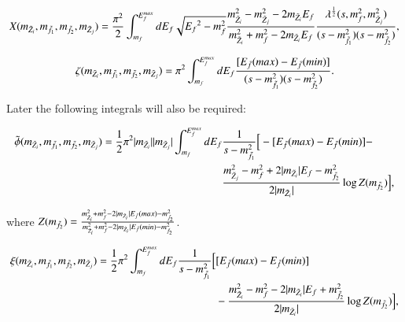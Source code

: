 \documentclass[final,3p,times]{elsarticle}
\begin{document}
\begin{equation}  \label{Xintegral}
X(m_{\tilde{Z}_i},m_{\tilde{f}_1},m_{\tilde{f}_2},m_{\tilde{Z}_j}) ={\pi^2 \over 2} \int_{m_{f}}^{E^{max}_{f}} dE_f \sqrt{{E_f}^2 - m_{f}^2} {m_{\tilde{Z}_i}^2 - m_{\tilde{Z}_j}^2 - 2m_{\tilde{Z}_i}E_{f} \over m_{\tilde{Z}_i}^2 + m_{f}^2 - 2m_{\tilde{Z}_i}E_{f}} {\lambda^{1 \over 2} (s,m_{f}^2, m_{\tilde{Z}_j}^2) \over (s-m_{\tilde{f}_1}^2)(s-m_{\tilde{f}_2}^2)},
\end{equation}


\begin{equation} \label{zetaintegral}
\zeta(m_{\tilde{Z}_i},m_{\tilde{f}_1},m_{\tilde{f}_2},m_{\tilde{Z}_j}) = \pi^2 \int_{m_{f}}^{E^{max}_{f}} dE_f {[E_{\bar{f}}(max) - E_{\bar{f}}(min)] \over (s-m_{\tilde{f}_1}^2)(s-m_{\tilde{f}_2}^2)}.
\end{equation}

Later the following integrals will also be required:


\begin{equation} \label{phitildaintegral}
\begin{aligned}
\tilde{\phi}(m_{\tilde{Z}_i},m_{\tilde{f}_1},m_{\tilde{f}_2},m_{\tilde{Z}_j}) = {1 \over 2} \pi^2 |m_{\tilde{Z}_i}||m_{\tilde{Z}_j}| \int_{m_{f}}^{E^{max}_{f}} dE_f & {1 \over s-m_{\tilde{f}_1}^2} \Big[-[E_{\bar{f}}(max) - E_{\bar{f}}(min)] - \\ & {m_{\tilde{Z}_j}^2 - m_{f}^2 + 2|m_{\tilde{Z}_i}|E_f - m_{\tilde{f}_2}^2 \over 2|m_{\tilde{Z}_i}|} \log Z(m_{\tilde{f}_2})\Big] ,
\end{aligned}
\end{equation}

where $Z(m_{\tilde{f}_2}) = {m_{\tilde{Z}_i}^2 + m_{f}^2 - 2|m_{\tilde{Z}_i}|E_{\bar{f}}(max) - m_{\tilde{f}_2}^2 \over m_{\tilde{Z}_i}^2 + m_{f}^2 - 2|m_{\tilde{Z}_i}|E_{\bar{f}}(min) - m_{\tilde{f}_2}^2}$.



\begin{equation} \label{xiintegral}
\begin{aligned}
\xi(m_{\tilde{Z}_i},m_{\tilde{f}_1},m_{\tilde{f}_2},m_{\tilde{Z}_j}) = {1 \over 2} \pi^2 \int_{m_{f}}^{E^{max}_{f}} dE_f {1 \over s-m_{\tilde{f}_1}^2} \Big[&[E_{\bar{f}}(max) - E_{\bar{f}}(min)] \\ & - {m_{\tilde{Z}_i}^2 - m_{f}^2 - 2|m_{\tilde{Z}_i}|E_f + m_{\tilde{f}_2}^2 \over 2|m_{\tilde{Z}_i}|} \log Z(m_{\tilde{f}_2})\Big] ,
\end{aligned}
\end{equation}
\end{document}
